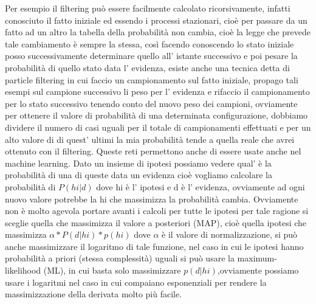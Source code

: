 		Per esempio il filtering può essere facilmente calcolato ricorsivamente, infatti conosciuto il fatto iniziale ed essendo i processi stazionari, cioè per passare da un fatto ad un altro la tabella della probabilità non cambia, cioè la legge che prevede tale cambiamento è sempre la stessa, così facendo conoscendo lo stato iniziale posso successivamente determinare quello all' istante successivo e poi pesare la probabilità di quello stato data l' evidenza, esiste anche una tecnica detta di particle filtering in cui faccio un campionamento sul fatto iniziale, propago tali esempi sul campione successivo li peso per l' evidenza e rifaccio il campionamento per lo stato successivo tenendo conto del nuovo peso dei campioni, ovviamente per ottenere il valore di probabilità di una determinata configurazione, dobbiamo dividere il numero di casi uguali per il totale di campionamenti effettuati e per un alto valore di di quest' ultimi la mia probabilità tende a quella reale che avrei ottenuto con il filtering. Queste reti permettono anche di essere usate anche nel machine learning. Dato un insieme di ipotesi possiamo vedere qual' è la probabilità di una di queste data un evidenza cioè vogliamo calcolare la probabilità di $P(hi|d)$ dove hi è l' ipotesi e d è l' evidenza, ovviamente ad ogni nuovo valore potrebbe la hi che massimizza la probabilità cambia. Ovviamente non è molto agevola portare avanti i calcoli per tutte le ipotesi per tale ragione si sceglie quella che massimizza il valore a posteriori (MAP), cioè quella ipotesi che massimizza $\alpha*P(d|hi)*p(hi)$ dove $\alpha$ è il valore di normalizzazione, si può anche massimizzare il logaritmo di tale funzione, nel caso in cui le ipotesi hanno probabilità a priori (stessa complessità) uguali si può usare la maximum-likelihood (ML), in cui basta solo massimizzare $p(d|hi)$,ovviamente possiamo usare i logaritmi nel caso in cui compaiano esponenziali per rendere la massimizzazione della derivata molto più facile.